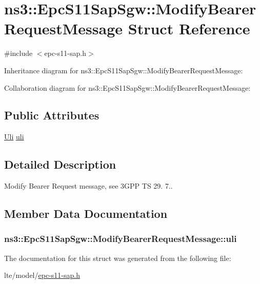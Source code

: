 \hypertarget{structns3_1_1EpcS11SapSgw_1_1ModifyBearerRequestMessage}{}\section{ns3\+:\+:Epc\+S11\+Sap\+Sgw\+:\+:Modify\+Bearer\+Request\+Message Struct Reference}
\label{structns3_1_1EpcS11SapSgw_1_1ModifyBearerRequestMessage}


{\ttfamily \#include $<$epc-\/s11-\/sap.\+h$>$}



Inheritance diagram for ns3\+:\+:Epc\+S11\+Sap\+Sgw\+:\+:Modify\+Bearer\+Request\+Message\+:


Collaboration diagram for ns3\+:\+:Epc\+S11\+Sap\+Sgw\+:\+:Modify\+Bearer\+Request\+Message\+:
\subsection*{Public Attributes}
\begin{DoxyCompactItemize}
\item 
\hyperlink{structns3_1_1EpcS11Sap_1_1Uli}{Uli} \hyperlink{structns3_1_1EpcS11SapSgw_1_1ModifyBearerRequestMessage_a19413966565ee83c24e6fd68eb6b9209}{uli}
\end{DoxyCompactItemize}


\subsection{Detailed Description}
Modify Bearer Request message, see 3\+G\+PP TS 29. 7.. 

\subsection{Member Data Documentation}
\subsubsection[{\texorpdfstring{uli}{uli}}]{ ns3\+::\+Epc\+S11\+Sap\+Sgw\+::\+Modify\+Bearer\+Request\+Message\+::uli}\hypertarget{structns3_1_1EpcS11SapSgw_1_1ModifyBearerRequestMessage_a19413966565ee83c24e6fd68eb6b9209}{}\label{structns3_1_1EpcS11SapSgw_1_1ModifyBearerRequestMessage_a19413966565ee83c24e6fd68eb6b9209}


The documentation for this struct was generated from the following file\+:\begin{DoxyCompactItemize}
\item 
lte/model/\hyperlink{epc-s11-sap_8h}{epc-\/s11-\/sap.\+h}\end{DoxyCompactItemize}
